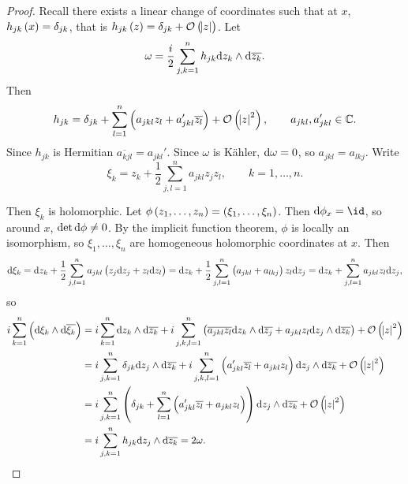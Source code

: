 \begin{proof}
Recall there exists a linear change of coordinates such that at $ x $, $ h_{jk}\br{x} = \delta_{jk} $, that is $ h_{jk}\br{z} = \delta_{jk} + \OOO\br{\abs{z}} $. Let
$$ \omega = \dfrac{i}{2}\sum_{j, k = 1}^n h_{jk} \mathrm{d} z_k \wedge \mathrm{d}\overline{z_k}. $$
Then
$$ h_{jk} = \delta_{jk} + \sum_{l = 1}^n \br{a_{jkl}z_l + a_{jkl}'\overline{z_l}} + \OOO\br{\abs{z}^2}, \qquad a_{jkl}, a_{jkl}' \in \CC. $$
Since $ h_{jk} $ is Hermitian $ \overline{a_{kjl}} = a_{jkl}' $. Since $ \omega $ is K\"ahler, $ \mathrm{d}\omega = 0 $, so $ a_{jkl} = a_{lkj} $. Write
$$ \xi_k = z_k + \dfrac{1}{2}\sum_{j, l = 1}^n a_{jkl}z_jz_l, \qquad k = 1, \dots, n. $$

\pagebreak

Then $ \xi_k $ is holomorphic. Let $ \phi\br{z_1, \dots, z_n} = \br{\xi_1, \dots, \xi_n} $. Then $ \d\phi_x = \id $, so around $ x $, $ \det \mathrm{d}\phi \ne 0 $. By the implicit function theorem, $ \phi $ is locally an isomorphism, so $ \xi_1, \dots, \xi_n $ are homogeneous holomorphic coordinates at $ x $. Then
$$ \d\xi_k = \d z_k + \dfrac{1}{2}\sum_{j, l = 1}^n a_{jkl}\br{z_j \d z_j + z_l \d z_l} = \d z_k + \dfrac{1}{2}\sum_{j, l = 1}^n \br{a_{jkl} + a_{lkj}}z_l \d z_j = \d z_k + \sum_{j, l = 1}^n a_{jkl}z_l \d z_j, $$
so
\begin{align*}
i\sum_{k = 1}^n \br{\d\xi_k \wedge \d\overline{\xi_k}}
& = i\sum_{k = 1}^n \d z_k \wedge \d\overline{z_k} + i\sum_{j, k, l = 1}^n \br{\overline{a_{jkl}z_l} \d z_k \wedge \d\overline{z_j} + a_{jkl}z_l \d z_j \wedge \d\overline{z_k}} + \OOO\br{\abs{z}^2} \\
& = i\sum_{j, k = 1}^n \delta_{jk} \d z_j \wedge \d\overline{z_k} + i\sum_{j, k, l = 1}^n \br{a_{jkl}'\overline{z_l} + a_{jkl}z_l} \d z_j \wedge \d\overline{z_k} + \OOO\br{\abs{z}^2} \\
& = i\sum_{j, k = 1}^n \br{\delta_{jk} + \sum_{l = 1}^n \br{a_{jkl}'\overline{z_l} + a_{jkl}z_l}} \d z_j \wedge \d\overline{z_k} + \OOO\br{\abs{z}^2} \\
& = i\sum_{j, k = 1}^n h_{jk} \d z_j \wedge \d\overline{z_k}
= 2\omega.
\end{align*}
\end{proof}

